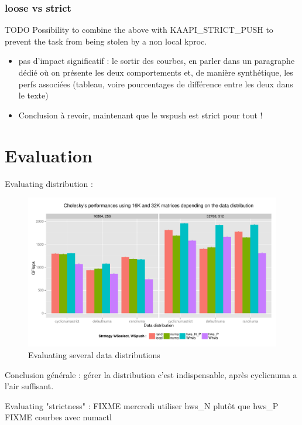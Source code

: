 \documentclass{Styles/llncs}
\begin{document}
\subsubsection{loose vs strict}

TODO
Possibility to combine the above with KAAPI\_STRICT\_PUSH to prevent the task from being stolen by a non local kproc.

\begin{itemize}
  \item pas d'impact significatif : le sortir des courbes, en parler
    dans un paragraphe dédié où on présente les deux comportements et,
    de manière synthétique, les perfs associées (tableau, voire
    pourcentages de différence entre les deux dans le texte)
  \item {\color{red}Conclusion à revoir, maintenant que le wspush est strict pour tout !}
\end{itemize}

\section{Evaluation}

Evaluating distribution :

\begin{figure}[t]
  \centering
  \includegraphics[scale=0.6]{figures/graph_distrib.pdf}
\caption{Evaluating several data distributions}
\label{fig:eval-distrib}
\end{figure}

Conclusion générale : gérer la distribution c'est indispensable, après cyclicnuma a l'air suffisant.


Evaluating "strictness" :
FIXME mercredi utiliser hws\_N plutôt que hws\_P
FIXME courbes avec numactl
\end{document}
